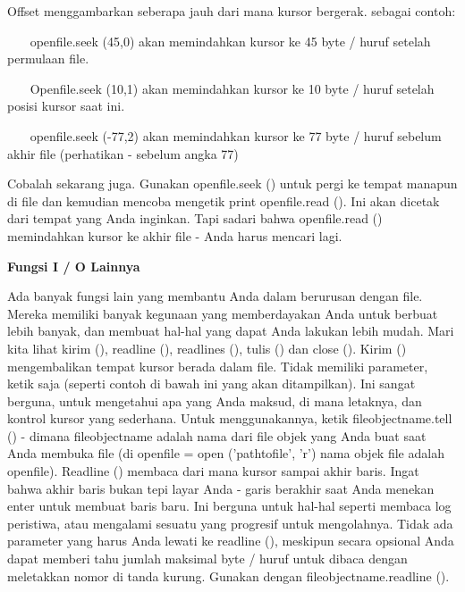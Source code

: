 \vspace{12pt}
\noindent 
Offset menggambarkan seberapa jauh dari mana kursor bergerak. sebagai contoh: \par
\vspace{12pt}
\noindent 
~~~ openfile.seek (45,0) akan memindahkan kursor ke 45 byte / huruf setelah permulaan file. \par
\noindent 
~~~ Openfile.seek (10,1) akan memindahkan kursor ke 10 byte / huruf setelah posisi kursor saat ini. \par
\noindent 
~~~ openfile.seek (-77,2) akan memindahkan kursor ke 77 byte / huruf sebelum akhir file (perhatikan - sebelum angka 77) \par
\vspace{12pt}
Cobalah sekarang juga. Gunakan openfile.seek () untuk pergi ke tempat manapun di file dan kemudian mencoba mengetik print openfile.read (). Ini akan dicetak dari tempat yang Anda inginkan. Tapi sadari bahwa openfile.read () memindahkan kursor ke akhir file - Anda harus mencari lagi. \par
\vspace{12pt}
\noindent 
{\fontsize{14pt}{14pt}\selectfont \textbf{Fungsi I / O Lainnya} \\} \par
\vspace{12pt}
Ada banyak fungsi lain yang membantu Anda dalam berurusan dengan file. Mereka memiliki banyak kegunaan yang memberdayakan Anda untuk berbuat lebih banyak, dan membuat hal-hal yang dapat Anda lakukan lebih mudah. Mari kita lihat kirim (), readline (), readlines (), tulis () dan close (). Kirim () mengembalikan tempat kursor berada dalam file. Tidak memiliki parameter, ketik saja (seperti contoh di bawah ini yang akan ditampilkan). Ini sangat berguna, untuk mengetahui apa yang Anda maksud, di mana letaknya, dan kontrol kursor yang sederhana. Untuk menggunakannya, ketik fileobjectname.tell () - dimana fileobjectname adalah nama dari file objek yang Anda buat saat Anda membuka file (di openfile = open ('pathtofile', 'r') nama objek file adalah openfile). Readline () membaca dari mana kursor sampai akhir baris. Ingat bahwa akhir baris bukan tepi layar Anda - garis berakhir saat Anda menekan enter untuk membuat baris baru. Ini berguna untuk hal-hal seperti membaca log peristiwa, atau mengalami sesuatu yang progresif untuk mengolahnya. Tidak ada parameter yang harus Anda lewati ke readline (), meskipun secara opsional Anda dapat memberi tahu jumlah maksimal byte / huruf untuk dibaca dengan meletakkan nomor di tanda kurung. Gunakan dengan fileobjectname.readline (). \par
